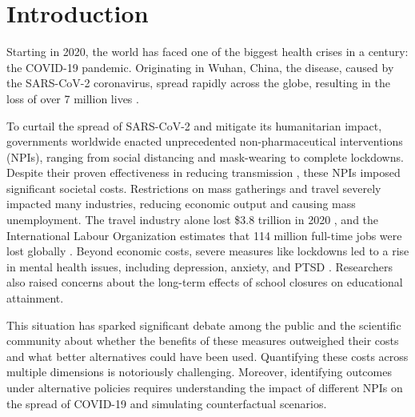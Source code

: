 \documentclass[msom,blindrev]{informs3} %
\begin{document}

\maketitle
\section{Introduction}
\label{sec:introduction}
Starting in 2020, the world has faced one of the biggest health crises in a century: the COVID-19 pandemic. Originating in Wuhan, China, the disease, caused by the SARS-CoV-2 coronavirus, spread rapidly across the globe, resulting in the loss of over 7 million lives .

To curtail the spread of SARS-CoV-2 and mitigate its humanitarian impact, governments worldwide enacted unprecedented non-pharmaceutical interventions (NPIs), ranging from social distancing and mask-wearing to complete lockdowns. Despite their proven effectiveness in reducing transmission , these NPIs imposed significant societal costs. Restrictions on mass gatherings and travel severely impacted many industries, reducing economic output and causing mass unemployment. The travel industry alone lost \$3.8 trillion in 2020 , and the International Labour Organization estimates that 114 million full-time jobs were lost globally . Beyond economic costs, severe measures like lockdowns led to a rise in mental health issues, including depression, anxiety, and PTSD . Researchers also raised concerns about the long-term effects of school closures on educational attainment. 

This situation has sparked significant debate among the public and the scientific community about whether the benefits of these measures outweighed their costs and what better alternatives could have been used. Quantifying these costs across multiple dimensions is notoriously challenging. Moreover, identifying outcomes under alternative policies requires understanding the impact of different NPIs on the spread of COVID-19 and simulating counterfactual scenarios.
\end{document}
